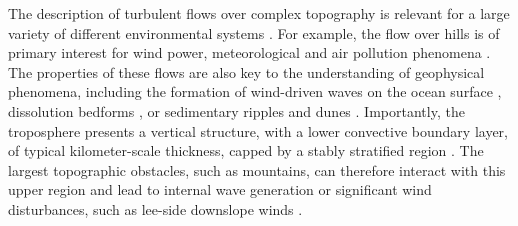 The description of turbulent flows over complex topography is relevant for a large variety of different environmental systems \citep{Sherman1978, Walmsley1982, baines1995, Wood2000, Venditti2013, Finnigan2020}. For example, the flow over hills is of primary interest for wind power, meteorological and air pollution phenomena \citep{Taylor1987}. The properties of these flows are also key to the understanding of geophysical phenomena, including the formation of wind-driven waves on the ocean surface \citep{Sullivan2010}, dissolution bedforms \citep{Claudin2017, Guerin2020}, or sedimentary ripples and dunes \citep{Bagnold1941, Charru2013, Courrech2015}. Importantly, the troposphere presents a vertical structure, with a lower convective boundary layer, of typical kilometer-scale thickness, capped by a stably stratified region \citep{Stull1988}. The largest topographic obstacles, such as mountains, can therefore interact with this upper region and lead to internal wave generation or significant wind disturbances, such as lee-side downslope winds \citep{Durran1990}.

